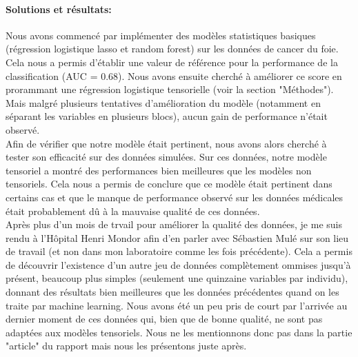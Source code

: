 \documentclass[preprint,12pt]{elsarticle}
\begin{document}
\paragraph*{Solutions et résultats:} Nous avons commencé par implémenter des modèles statistiques basiques (régression logistique lasso et random forest) sur les données de cancer du foie. Cela nous a permis d'établir une valeur de référence pour la performance de la classification (AUC = 0.68). Nous avons ensuite cherché à améliorer ce score en prorammant une régression logistique tensorielle (voir la section "Méthodes"). Mais malgré plusieurs tentatives d'amélioration du modèle (notamment en séparant les variables en plusieurs blocs), aucun gain de performance n'était observé.\\
\indent Afin de vérifier que notre modèle était pertinent, nous avons alors cherché à tester son efficacité sur des données simulées. Sur ces données, notre modèle tensoriel a montré des performances bien meilleures que les modèles non tensoriels. Cela nous a permis de conclure que ce modèle était pertinent dans certains cas et que le manque de performance observé sur les données médicales était probablement dû à la mauvaise qualité de ces données.\\
\indent Après plus d'un mois de trvail pour améliorer la qualité des données, je me suis rendu à l'Hôpital Henri Mondor afin d'en parler avec Sébastien Mulé sur son lieu de travail (et non dans mon laboratoire comme les fois précédente). Cela a permis de découvrir l'existence d'un autre jeu de données complètement ommises jusqu'à présent, beaucoup plus simples (seulement une quinzaine variables par individu), donnant des résultats bien meilleures que les données précédentes quand on les traite par machine learning. Nous avons été un peu pris de court par l'arrivée au dernier moment de ces données qui, bien que de bonne qualité, ne sont pas adaptées aux modèles tensoriels. Nous ne les mentionnons donc pas dans la partie "article" du rapport mais nous les présentons juste après.\\

\newpage
\tableofcontents
\newpage
\end{document}
